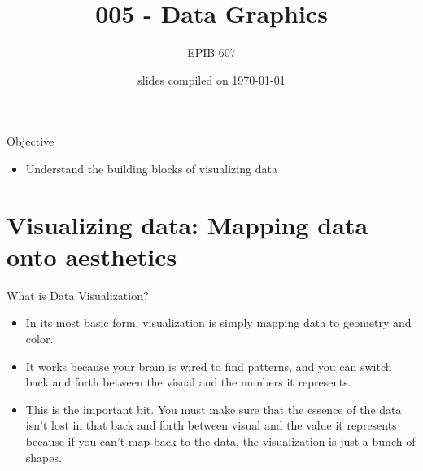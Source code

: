 \documentclass[10pt,handout]{beamer}\usepackage[]{graphicx}\usepackage[]{color}
\begin{document}
	
	
	
	
	\title{005 - Data Graphics}
	\author{EPIB 607}
	
	\date{slides compiled on \today}
	
	\maketitle
	
	\begin{frame}{Objective}
	\begin{itemize}
		\item Understand the building blocks of visualizing data
	\end{itemize}
	\end{frame}
	
	\section{Visualizing data: Mapping data onto aesthetics}
	
		\begin{frame}{What is Data Visualization?}
		\begin{itemize}
			\item In its most basic form, visualization is simply mapping data to geometry and color. 
			\item It works because your brain is wired to find patterns, and you can switch back and forth between the visual and the numbers it represents. 
			\item This is the important bit. You must make sure that the essence of the data isn't lost in that back and forth between visual and the value it represents because if you can't map back to the data, the visualization is just a bunch of shapes.
		\end{itemize}
	\end{frame}
	
\end{document}
